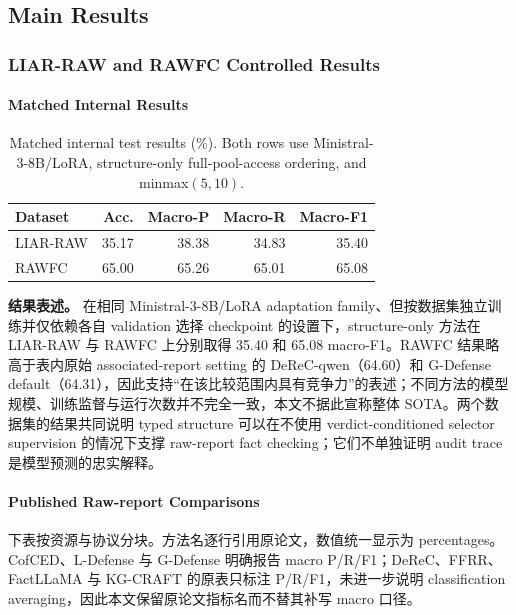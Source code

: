 \documentclass[letterpaper]{article}
\begin{document}
\FloatBarrier
\subsection{Main Results}

\subsubsection{LIAR-RAW and RAWFC Controlled Results}

\paragraph{Matched Internal Results}

\begin{table}[t]
\centering
\scriptsize
\setlength{\tabcolsep}{2pt}
\renewcommand{\arraystretch}{1.08}
\caption{Matched internal test results (\%). Both rows use Ministral-3-8B/LoRA, structure-only full-pool-access ordering, and minmax$(5,10)$.}
\label{tab:matched-results}
\begin{tabularx}{\columnwidth}{@{}Y r r r r@{}}
\toprule
\textbf{Dataset} & \textbf{Acc.} & \textbf{Macro-P} & \textbf{Macro-R} & \textbf{Macro-F1} \\
\midrule
LIAR-RAW & 35.17 & 38.38 & 34.83 & 35.40 \\
RAWFC & 65.00 & 65.26 & 65.01 & 65.08 \\
\bottomrule
\end{tabularx}
\end{table}

\textbf{结果表述。} 在相同 Ministral-3-8B/LoRA adaptation family、但按数据集独立训练并仅依赖各自 validation 选择 checkpoint 的设置下，structure-only 方法在 LIAR-RAW 与 RAWFC 上分别取得 35.40 和 65.08 macro-F1。RAWFC 结果略高于表内原始 associated-report setting 的 DeReC-qwen（64.60）和 G-Defense default（64.31），因此支持“在该比较范围内具有竞争力”的表述；不同方法的模型规模、训练监督与运行次数并不完全一致，本文不据此宣称整体 SOTA。两个数据集的结果共同说明 typed structure 可以在不使用 verdict-conditioned selector supervision 的情况下支撑 raw-report fact checking；它们不单独证明 audit trace 是模型预测的忠实解释。

\paragraph{Published Raw-report Comparisons}

下表按资源与协议分块。方法名逐行引用原论文，数值统一显示为 percentages。CofCED、L-Defense 与 G-Defense 明确报告 macro P/R/F1；DeReC、FFRR、FactLLaMA 与 KG-CRAFT 的原表只标注 P/R/F1，未进一步说明 classification averaging，因此本文保留原论文指标名而不替其补写 macro 口径。
\end{document}
